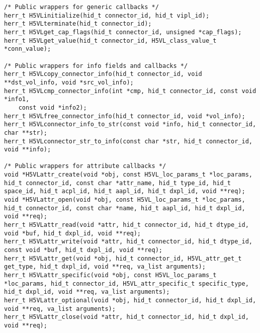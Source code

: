 \begin{appendices}
\begin{lstlisting}
/* Public wrappers for generic callbacks */                                      
herr_t H5VLinitialize(hid_t connector_id, hid_t vipl_id);                 
herr_t H5VLterminate(hid_t connector_id);                                 
herr_t H5VLget_cap_flags(hid_t connector_id, unsigned *cap_flags);        
herr_t H5VLget_value(hid_t connector_id, H5VL_class_value_t *conn_value); 
                                                                                 
/* Public wrappers for info fields and callbacks */                              
herr_t H5VLcopy_connector_info(hid_t connector_id, void **dst_vol_info, void *src_vol_info);
herr_t H5VLcmp_connector_info(int *cmp, hid_t connector_id, const void *info1,
    const void *info2);                                                          
herr_t H5VLfree_connector_info(hid_t connector_id, void *vol_info);       
herr_t H5VLconnector_info_to_str(const void *info, hid_t connector_id, char **str);
herr_t H5VLconnector_str_to_info(const char *str, hid_t connector_id, void **info);

/* Public wrappers for attribute callbacks */                                    
void *H5VLattr_create(void *obj, const H5VL_loc_params_t *loc_params, hid_t connector_id, const char *attr_name, hid_t type_id, hid_t space_id, hid_t acpl_id, hid_t aapl_id, hid_t dxpl_id, void **req);
void *H5VLattr_open(void *obj, const H5VL_loc_params_t *loc_params, hid_t connector_id, const char *name, hid_t aapl_id, hid_t dxpl_id, void **req);
herr_t H5VLattr_read(void *attr, hid_t connector_id, hid_t dtype_id, void *buf, hid_t dxpl_id, void **req);
herr_t H5VLattr_write(void *attr, hid_t connector_id, hid_t dtype_id, const void *buf, hid_t dxpl_id, void **req);
herr_t H5VLattr_get(void *obj, hid_t connector_id, H5VL_attr_get_t get_type, hid_t dxpl_id, void **req, va_list arguments);
herr_t H5VLattr_specific(void *obj, const H5VL_loc_params_t *loc_params, hid_t connector_id, H5VL_attr_specific_t specific_type, hid_t dxpl_id, void **req, va_list arguments);
herr_t H5VLattr_optional(void *obj, hid_t connector_id, hid_t dxpl_id, void **req, va_list arguments);
herr_t H5VLattr_close(void *attr, hid_t connector_id, hid_t dxpl_id, void **req);
                                                                                 

\end{lstlisting}
\end{appendices}
